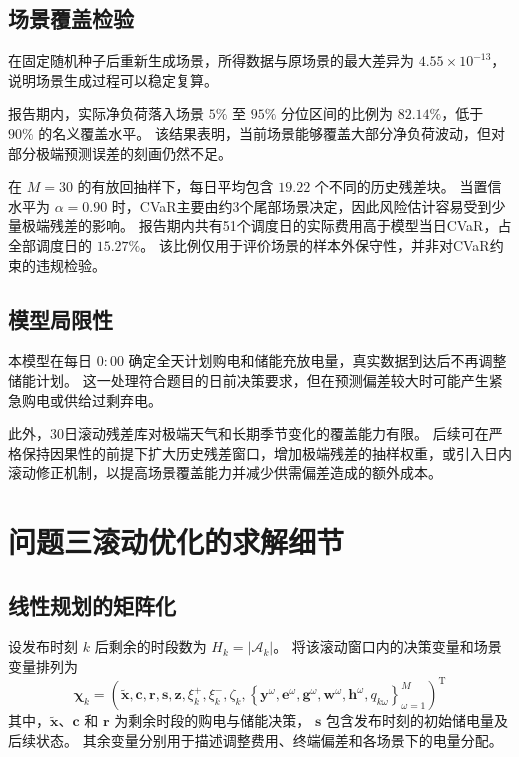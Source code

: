 \subsection{场景覆盖检验}

在固定随机种子后重新生成场景，所得数据与原场景的最大差异为
\(4.55\times10^{-13}\)，说明场景生成过程可以稳定复算。

报告期内，实际净负荷落入场景
\(5\%\) 至 \(95\%\) 分位区间的比例为
\(82.14\%\)，低于 \(90\%\) 的名义覆盖水平。
该结果表明，当前场景能够覆盖大部分净负荷波动，但对部分极端预测误差的刻画仍然不足。

在 \(M=30\) 的有放回抽样下，每日平均包含
\(19.22\) 个不同的历史残差块。
当置信水平为 \(\alpha=0.90\) 时，CVaR主要由约3个尾部场景决定，因此风险估计容易受到少量极端残差的影响。
报告期内共有51个调度日的实际费用高于模型当日CVaR，占全部调度日的
\(15.27\%\)。
该比例仅用于评价场景的样本外保守性，并非对CVaR约束的违规检验。

\subsection{模型局限性}

本模型在每日 \(0{:}00\) 确定全天计划购电和储能充放电量，真实数据到达后不再调整储能计划。
这一处理符合题目的日前决策要求，但在预测偏差较大时可能产生紧急购电或供给过剩弃电。

此外，30日滚动残差库对极端天气和长期季节变化的覆盖能力有限。
后续可在严格保持因果性的前提下扩大历史残差窗口，增加极端残差的抽样权重，或引入日内滚动修正机制，以提高场景覆盖能力并减少供需偏差造成的额外成本。

\section{问题三滚动优化的求解细节}
\label{app:q3_solution}

\subsection{线性规划的矩阵化}

设发布时刻 \(k\) 后剩余的时段数为
\(H_k=|\mathcal A_k|\)。
将该滚动窗口内的决策变量和场景变量排列为
\begin{equation}
\boldsymbol{\chi}_k
=
\left(
\widetilde{\boldsymbol{x}},
\boldsymbol{c},
\boldsymbol{r},
\boldsymbol{s},
\boldsymbol{z},
\xi_k^+,
\xi_k^-,
\zeta_k,
\left\{
\boldsymbol{y}^{\omega},
\boldsymbol{e}^{\omega},
\boldsymbol{g}^{\omega},
\boldsymbol{w}^{\omega},
\boldsymbol{h}^{\omega},
q_{k\omega}
\right\}_{\omega=1}^{M}
\right)^{\mathrm T}
\label{eq:app_q3_variable_vector}
\end{equation}
其中，\(\widetilde{\boldsymbol{x}}\)、\(\boldsymbol{c}\) 和
\(\boldsymbol{r}\) 为剩余时段的购电与储能决策，
\(\boldsymbol{s}\) 包含发布时刻的初始储电量及后续状态。
其余变量分别用于描述调整费用、终端偏差和各场景下的电量分配。

